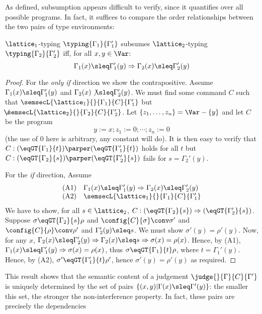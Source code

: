 \documentclass{sigplanconf}
\begin{document}
As defined, subsumption appears difficult to verify, since it quantifies over all possible programs.
In fact, it suffices to compare the order relationships between the two pairs
of type environments:
\begin{theorem}\label{theorem:subsumption}
    $\lattice_1$-typing $\typing{\Gamma_1}{\Gamma'_1}$ subsumes
    $\lattice_2$-typing $\typing{\Gamma_2}{\Gamma'_2}$\; iff, for all $x,y \in \Var$:
    \[
        \Gamma_1(x) \sleq \Gamma'_1(y) => \Gamma_2(x) \sleq \Gamma'_2(y)
    \]
\end{theorem}
\begin{proof}
For the \emph{only if} direction we show the contrapositive.
Assume $\Gamma_1(x) \sleq \Gamma_1'(y)$ and $\Gamma_2(x) \not\sleq \Gamma_2'(y)$.
We must find some command $C$ such that
$\semsecL{\lattice_1}{}{\Gamma_1}{C}{\Gamma'_1}$
but $\not\!\!\!\semsecL{\lattice_2}{}{\Gamma_2}{C}{\Gamma'_2}$.
Let $\{ z_1,\ldots,z_n \} = \Var - \{y\}$ and let $C$ be
the program
\[
        y := x ; z_1 := 0 ; \cdots ; z_n := 0
\]
(the use of $0$ here is arbitrary, any constant will do). It is then easy to verify that
$C: (\eqGT{\Gamma_1}{t}) \parper (\eqGT{\Gamma_1'}{t})$ holds for all $t$ but
$C: (\eqGT{\Gamma_2}{s}) \parper (\eqGT{\Gamma_2'}{s})$ fails for $s = \Gamma_2'(y)$.

For the \emph{if} direction,
Assume
\[
\begin{array}{ll}
        \mathrm{(A1)} & \Gamma_1(x) \sleq \Gamma_1'(y) => \Gamma_2(x) \sleq \Gamma_2'(y) \\
        \mathrm{(A2)} & \semsecL{\lattice_1}{}{\Gamma_1}{C}{\Gamma'_1}
\end{array}
\]
We have to show, for all $s \in \lattice_2$, $C : (\eqGT{\Gamma_2}{s}) => (\eqGT{\Gamma_2'}{s})$.
Suppose $\sigma \eqGT{\Gamma_2}{s} \rho$ and $\config{C}{\sigma} \conv \sigma'$
and
$\config{C}{\rho} \conv \rho'$
and
$\Gamma_2'(y) \sleq s$.
We must show $\sigma'(y) = \rho'(y)$.
Now, for any $x$,
$\Gamma_2(x) \sleq \Gamma_2'(y) => \Gamma_2(x) \sleq s => \sigma(x) = \rho(x)$.
Hence, by (A1),
$\Gamma_1(x) \sleq \Gamma_1'(y) => \sigma(x) = \rho(x)$,
thus $\sigma \eqGT{\Gamma_1}{t} \rho$, where
$t = \Gamma_1'(y)$.
Hence, by (A2),
$\sigma' \eqGT{\Gamma_1'}{t} \rho'$,
hence
$\sigma'(y) = \rho'(y)$ as required.
\end{proof}
This result shows that the semantic content of a judgement
$\judge{}{\Gamma}{C}{\Gamma'}$ is uniquely determined by the set of pairs
$\{ (x,y) | \Gamma(x) \sleq \Gamma'(y) \}$: the smaller this set, the stronger
the non-interference property. In fact, these pairs are precisely the dependencies
\end{document}
